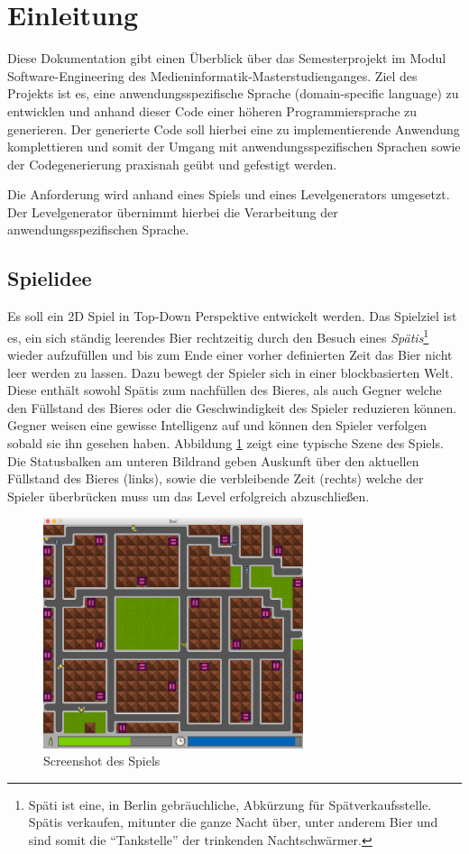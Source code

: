 \section{Einleitung}

Diese Dokumentation gibt einen Überblick über das Semesterprojekt im Modul Software-Engineering des Medieninformatik-Masterstudienganges.
Ziel des Projekts ist es, eine anwendungsspezifische Sprache (domain-specific language) zu entwicklen und anhand dieser Code einer höheren Programmiersprache zu generieren.
Der generierte Code soll hierbei eine zu implementierende Anwendung komplettieren und somit der Umgang mit anwendungsspezifischen Sprachen sowie der Codegenerierung praxisnah geübt und gefestigt werden.

Die Anforderung wird anhand eines Spiels und eines Levelgenerators umgesetzt.
Der Levelgenerator übernimmt hierbei die Verarbeitung der anwendungsspezifischen Sprache.

\subsection{Spielidee}

Es soll ein 2D Spiel in Top-Down Perspektive entwickelt werden.
Das Spielziel ist es, ein sich ständig leerendes Bier rechtzeitig durch den Besuch eines \textit{Spätis}\footnote{Späti ist eine, in Berlin gebräuchliche, Abkürzung für Spätverkaufsstelle. Spätis verkaufen, mitunter die ganze Nacht über, unter anderem Bier und sind somit die ``Tankstelle'' der trinkenden Nachtschwärmer.}
wieder aufzufüllen und bis zum Ende einer vorher definierten Zeit das Bier nicht leer werden zu lassen.
Dazu bewegt der Spieler sich in einer blockbasierten Welt.
Diese enthält sowohl Spätis zum nachfüllen des Bieres, als auch Gegner welche den Füllstand des Bieres oder die Geschwindigkeit des Spieler reduzieren können.
Gegner weisen eine gewisse Intelligenz auf und können den Spieler verfolgen sobald sie ihn gesehen haben.
Abbildung \ref{fig:einleitung:screenshot} zeigt eine typische Szene des Spiels.
Die Statusbalken am unteren Bildrand geben Auskunft über den aktuellen Füllstand des Bieres (links), sowie die verbleibende Zeit (rechts) welche der Spieler überbrücken muss um das Level erfolgreich abzuschließen.

\begin{figure}[]
\centering
\includegraphics[width=3in]{img/02_screenshot.png}
\caption{Screenshot des Spiels}
\label{fig:einleitung:screenshot}
\end{figure}


